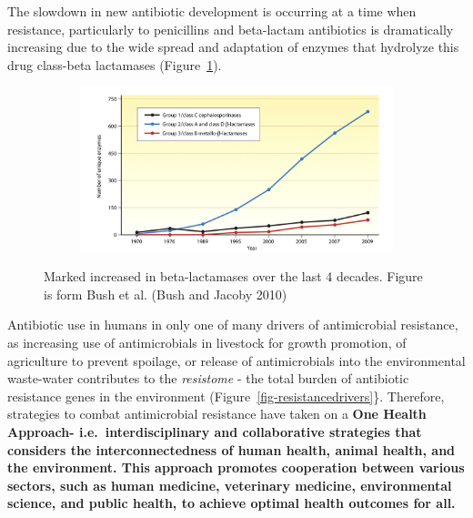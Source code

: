 \documentclass[
  letterpaper,
  DIV=11,
  numbers=noendperiod]{scrreprt}
\begin{document}
The slowdown in new antibiotic development is occurring at a time when
resistance, particularly to penicillins and beta-lactam antibiotics is
dramatically increasing due to the wide spread and adaptation of enzymes
that hydrolyze this drug class-beta lactamases
(Figure~\ref{fig-betalactmases}).

\begin{figure}

{\centering 

\begin{figure}

{\centering \includegraphics[width=15.625in,height=\textheight]{images/betalactamases.png}

}

\end{figure}

}

\caption{\label{fig-betalactmases}Marked increased in beta-lactamases
over the last 4 decades. Figure is form Bush et al. (Bush and Jacoby
2010)}

\end{figure}

Antibiotic use in humans in only one of many drivers of antimicrobial
resistance, as increasing use of antimicrobials in livestock for growth
promotion, of agriculture to prevent spoilage, or release of
antimicrobials into the environmental waste-water contributes to the
\emph{resistome} - the total burden of antibiotic resistance genes in
the environment (Figure~\ref{fig-resistancedrivers}\}. Therefore,
strategies to combat antimicrobial resistance have taken on a
\textbf{One Health Approach- i.e.~interdisciplinary and collaborative
strategies that considers the interconnectedness of human health, animal
health, and the environment. This approach promotes cooperation between
various sectors, such as human medicine, veterinary medicine,
environmental science, and public health, to achieve optimal health
outcomes for all.}
\end{document}
